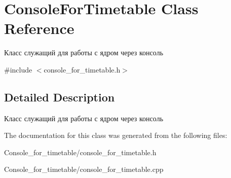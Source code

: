 \hypertarget{class_console_for_timetable}{}\section{Console\+For\+Timetable Class Reference}
\label{class_console_for_timetable}


Класс служащий для работы с ядром через консоль  




{\ttfamily \#include $<$console\+\_\+for\+\_\+timetable.\+h$>$}



\subsection{Detailed Description}
Класс служащий для работы с ядром через консоль 

The documentation for this class was generated from the following files\+:\begin{DoxyCompactItemize}
\item 
Console\+\_\+for\+\_\+timetable/console\+\_\+for\+\_\+timetable.\+h\item 
Console\+\_\+for\+\_\+timetable/console\+\_\+for\+\_\+timetable.\+cpp\end{DoxyCompactItemize}
